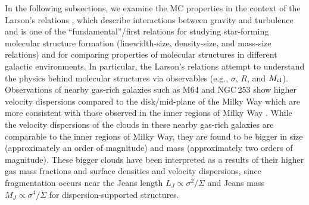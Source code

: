 \documentclass[apj]{emulateapj} %
\begin{document}
In the following subsections, 
we examine the MC properties in the context of the Larson's relations \citep{Larson81a}, which 
describe interactions between gravity and turbulence and is one of the ``fundamental''/first 
relations for studying star-forming molecular structure formation (linewidth-size, 
density-size, and mass-size relations) and for comparing properties of molecular structures
in different galactic environments.
In particular, the Larson's relations attempt to understand the physics behind molecular 
structures via observables (e.g., $\sigma$, $R$, and $M_{\rm cl}$).
Observations of nearby gas-rich galaxies such as M64 and NGC\,253 
show higher velocity dispersions compared 
to the disk/mid-plane of the Milky Way which 
are more consistent with those observed in the inner regions of 
Milky Way \citep{Oka01a, Rosolowsky05a, Heyer09a, Leroy15a}.  %
While the velocity dispersions of the clouds in these nearby gas-rich galaxies are comparable
to the inner regions of Milky Way, they are found to be bigger in size (approximately 
an order of magnitude) and mass (approximately two orders of magnitude).
These bigger clouds have been interpreted as a results of their higher gas mass fractions and 
surface densities and velocity dispersions, since 
fragmentation occurs near the Jeans length $L_J\propto\sigma^2/\Sigma$ 
and Jeans mass $M_J\propto\sigma^4/\Sigma$
for dispersion-supported structures.
\end{document}
